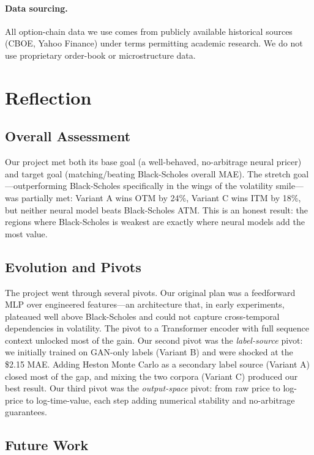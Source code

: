 \documentclass[conference]{IEEEtran}
\begin{document}
\paragraph*{Data sourcing.}
All option-chain data we use comes from publicly available
historical sources (CBOE, Yahoo Finance) under terms permitting
academic research. We do not use proprietary order-book or
microstructure data.

\section{Reflection}

\subsection{Overall Assessment}

Our project met both its base goal (a well-behaved, no-arbitrage
neural pricer) and target goal (matching/beating Black-Scholes
overall MAE). The stretch goal---outperforming Black-Scholes
specifically in the wings of the volatility smile---was
partially met: Variant A wins OTM by 24\%, Variant C wins ITM
by 18\%, but neither neural model beats Black-Scholes ATM.
This is an honest result: the regions where Black-Scholes is
weakest are exactly where neural models add the most value.

\subsection{Evolution and Pivots}

The project went through several pivots. Our original plan was
a feedforward MLP over engineered features---an architecture
that, in early experiments, plateaued well above Black-Scholes
and could not capture cross-temporal dependencies in volatility.
The pivot to a Transformer encoder with full sequence context
unlocked most of the gain. Our second pivot was the
\emph{label-source} pivot: we initially trained on
GAN-only labels (Variant B) and were shocked at the \$2.15 MAE.
Adding Heston Monte Carlo as a secondary label source (Variant
A) closed most of the gap, and mixing the two corpora (Variant
C) produced our best result. Our third pivot was the
\emph{output-space} pivot: from raw price to log-price to
log-time-value, each step adding numerical stability and
no-arbitrage guarantees.

\subsection{Future Work}
\end{document}
